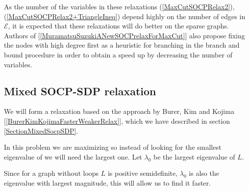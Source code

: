 \documentclass[12pt]{book}
\theoremstyle{definition}
\begin{document}
As the number of the variables in these relaxations (\ref{MaxCutSOCPRelax2}), (\ref{MaxCutSOCPRelax2+TriangleIneq}) depend highly on the number of edges in $\mathcal{E}$, it is expected that these relaxations will do better on the sparse graphs. Authors of [\ref{MuramatsuSuzukiANewSOCPrelaxForMaxCut}] also propose fixing the nodes with high degree first as a heuristic for branching in the branch and bound procedure in order to obtain a speed up by decreasing the number of variables.

\subsection{Mixed SOCP-SDP relaxation}

We will form a relaxation based on the approach by Burer, Kim and Kojima  [\ref{BurerKimKojimaFasterWeakerRelax}], which we have described in section \ref{SectionMixedSocpSDP}.

In this problem we are maximizing so instead of looking for the smallest eigenvalue of we will need the largest one. Let  $\lambda_{0}$ be the largest eigenvalue of $L$.

\rem Since for a graph without loops $L$ is positive semidefinite, $\lambda_{0}$ is also the eigenvalue with largest magnitude, this will allow us to find it faster.
\end{document}
